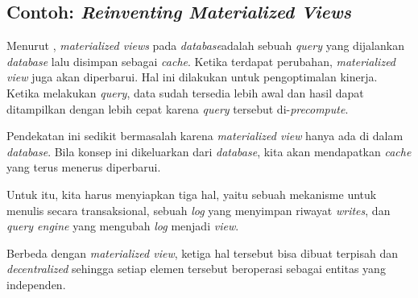 \subsection{Contoh: \textit{Reinventing Materialized Views}}

Menurut \cite{leverageDatabaseInsideOut}, \textit{materialized views} pada \textit{database}adalah sebuah \textit{query} yang dijalankan \textit{database} lalu disimpan sebagai \textit{cache}. Ketika terdapat perubahan, \textit{materialized view} juga akan diperbarui. Hal ini dilakukan untuk pengoptimalan kinerja. Ketika melakukan \textit{query}, data sudah tersedia lebih awal dan hasil dapat ditampilkan dengan lebih cepat karena \textit{query} tersebut di-\textit{precompute}.

Pendekatan ini sedikit bermasalah karena \textit{materialized view} hanya ada di dalam \textit{database}. Bila konsep ini dikeluarkan dari \textit{database}, kita akan mendapatkan \textit{cache} yang terus menerus diperbarui.

Untuk itu, kita harus menyiapkan tiga hal, yaitu sebuah mekanisme untuk menulis secara transaksional, sebuah \textit{log} yang menyimpan riwayat \textit{writes}, dan \textit{query engine} yang mengubah \textit{log} menjadi \textit{view}.

Berbeda dengan \textit{materialized view}, ketiga hal tersebut bisa dibuat terpisah dan \textit{decentralized} sehingga setiap elemen tersebut beroperasi sebagai entitas yang independen.